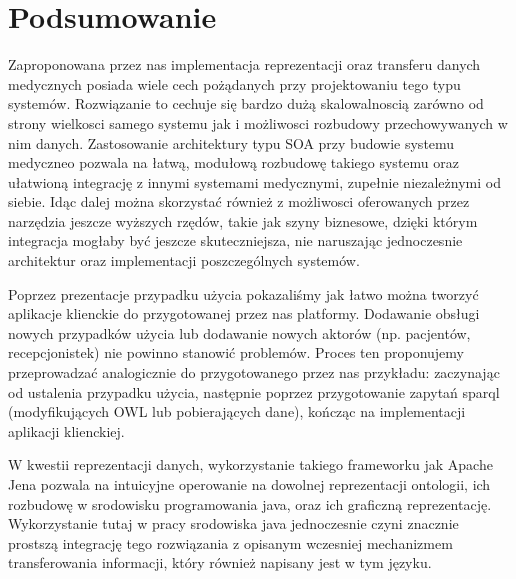 \section{Podsumowanie}
\label{cha:podsumowanie}

Zaproponowana przez nas implementacja reprezentacji oraz transferu danych medycznych posiada wiele cech pożądanych przy projektowaniu tego typu systemów. Rozwiązanie to cechuje się bardzo dużą skalowalnoscią zarówno od strony wielkosci samego systemu jak i możliwosci rozbudowy przechowywanych w nim danych. Zastosowanie architektury typu SOA przy budowie systemu medyczneo pozwala na łatwą, modułową rozbudowę takiego systemu oraz ułatwioną integrację z innymi systemami medycznymi, zupełnie niezależnymi od siebie. Idąc dalej można skorzystać również z możliwosci oferowanych przez narzędzia jeszcze wyższych rzędów, takie jak szyny biznesowe, dzięki którym integracja mogłaby być jeszcze skuteczniejsza, nie naruszając jednoczesnie architektur oraz implementacji poszczególnych systemów.

Poprzez prezentacje przypadku użycia pokazaliśmy jak łatwo można tworzyć aplikacje klienckie do przygotowanej przez nas platformy. Dodawanie obsługi nowych przypadków użycia lub dodawanie nowych aktorów (np. pacjentów, recepcjonistek) nie powinno stanowić problemów. Proces ten proponujemy przeprowadzać analogicznie do przygotowanego przez nas przykładu: zaczynając od ustalenia przypadku użycia, następnie poprzez przygotowanie zapytań sparql (modyfikujących OWL lub pobierających dane), kończąc na implementacji aplikacji klienckiej.

W kwestii reprezentacji danych, wykorzystanie takiego frameworku jak Apache Jena pozwala na intuicyjne operowanie na dowolnej reprezentacji ontologii, ich rozbudowę w srodowisku programowania java, oraz ich graficzną reprezentację. Wykorzystanie tutaj w pracy srodowiska java jednoczesnie czyni znacznie prostszą integrację tego rozwiązania z opisanym wczesniej mechanizmem transferowania informacji, który również napisany jest w tym języku.